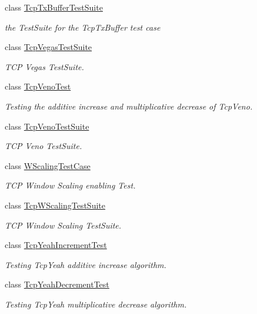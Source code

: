 \begin{DoxyCompactItemize}
class \hyperlink{classTcpTxBufferTestSuite}{Tcp\+Tx\+Buffer\+Test\+Suite}
\begin{DoxyCompactList}\small\item\em the Test\+Suite for the Tcp\+Tx\+Buffer test case \end{DoxyCompactList}\item 
class \hyperlink{classTcpVegasTestSuite}{Tcp\+Vegas\+Test\+Suite}
\begin{DoxyCompactList}\small\item\em T\+CP Vegas Test\+Suite. \end{DoxyCompactList}\item 
class \hyperlink{classTcpVenoTest}{Tcp\+Veno\+Test}
\begin{DoxyCompactList}\small\item\em Testing the additive increase and multiplicative decrease of Tcp\+Veno. \end{DoxyCompactList}\item 
class \hyperlink{classTcpVenoTestSuite}{Tcp\+Veno\+Test\+Suite}
\begin{DoxyCompactList}\small\item\em T\+CP Veno Test\+Suite. \end{DoxyCompactList}\item 
class \hyperlink{classWScalingTestCase}{W\+Scaling\+Test\+Case}
\begin{DoxyCompactList}\small\item\em T\+CP Window Scaling enabling Test. \end{DoxyCompactList}\item 
class \hyperlink{classTcpWScalingTestSuite}{Tcp\+W\+Scaling\+Test\+Suite}
\begin{DoxyCompactList}\small\item\em T\+CP Window Scaling Test\+Suite. \end{DoxyCompactList}\item 
class \hyperlink{classTcpYeahIncrementTest}{Tcp\+Yeah\+Increment\+Test}
\begin{DoxyCompactList}\small\item\em Testing Tcp\+Yeah additive increase algorithm. \end{DoxyCompactList}\item 
class \hyperlink{classTcpYeahDecrementTest}{Tcp\+Yeah\+Decrement\+Test}
\begin{DoxyCompactList}\small\item\em Testing Tcp\+Yeah multiplicative decrease algorithm. \end{DoxyCompactList}\item 

\end{DoxyCompactItemize}
